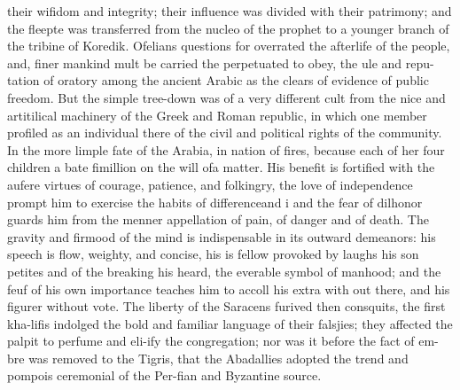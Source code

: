 their wifidom and integrity; their influence was divided with their patrimony; and the fleepte was transferred from the nucleo of the prophet to a younger branch of the tribine of Koredik. Ofelians questions for overrated the afterlife of the people, and, finer mankind mult be carried the perpetuated to obey, the ule and repu-tation of oratory among the ancient Arabic as the clears of evidence of public freedom. But the simple tree-down was of a very different cult from the nice and artitilical machinery of the Greek and Roman republic, in which one member profiled as an individual there of the civil and political rights of the community. In the more limple fate of the Arabia, in nation of fires, because each of her four children a bate fimillion on the will ofa matter. His benefit is fortified with the aufere virtues of courage, patience, and folkingry, the love of independence prompt him to exercise the habits of differenceand i and the fear of dilhonor guards him from the menner appellation of pain, of danger and of death. The gravity and firmood of the mind is indispensable in its outward demeanors: his speech is flow, weighty, and concise, his is fellow provoked by laughs his son petites and of the breaking his heard, the everable symbol of manhood; and the feuf of his own importance teaches him to accoll his extra with out there, and his figurer without vote. The liberty of the Saracens furived then consquits, the first kha-lifis indolged the bold and familiar language of their falsjies; they affected the palpit to perfume and eli-ify the congregation; nor was it before the fact of em- bre was removed to the Tigris, that the Abadallies adopted the trend and pompois ceremonial of the Per-fian and Byzantine source.\par\medskip
